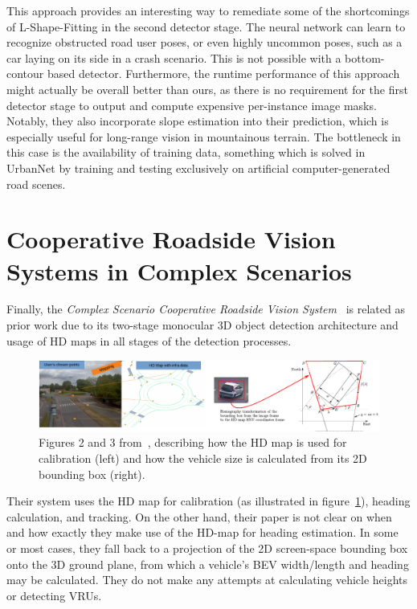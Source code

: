 This approach provides an interesting way to remediate some of the shortcomings of L-Shape-Fitting in the second detector stage.
The neural network can learn to recognize obstructed road user poses, or even highly uncommon poses, such as a car laying on its side in a crash scenario.
This is not possible with a bottom-contour based detector.
Furthermore, the runtime performance of this approach might actually be overall better than ours, as there is no requirement for the first detector stage to output and compute expensive per-instance image masks.
Notably, they also incorporate slope estimation into their prediction, which is especially useful for long-range vision in mountainous terrain.
The bottleneck in this case is the availability of training data, something which is solved in UrbanNet by training and testing exclusively on artificial computer-generated road scenes.

\section{Cooperative Roadside Vision Systems in Complex Scenarios}
\label{sec:related-crvis}

Finally, the \textit{Complex Scenario Cooperative Roadside Vision System}~\cite{masi2021augmented} is related as prior work due to its two-stage monocular 3D object detection architecture and usage of HD maps in all stages of the detection processes.

\begin{figure}[htb]
    \centering
    \includegraphics[width=1.0\linewidth]{figures/coop_roadside_vis_aug_perception_fig}
    \caption{Figures 2 and 3 from~\cite{masi2021augmented}, describing how the HD map is used for calibration (left) and how the vehicle size is calculated from its 2D bounding box (right).}
    \label{fig:related-crvis}
\end{figure}

Their system uses the HD map for calibration (as illustrated in figure~\ref{fig:related-crvis}), heading calculation, and tracking.
On the other hand, their paper is not clear on when and how exactly they make use of the HD-map for heading estimation.
In some or most cases, they fall back to a projection of the 2D screen-space bounding box onto the 3D ground plane, from which a vehicle's BEV width/length and heading may be calculated.
They do not make any attempts at calculating vehicle heights or detecting VRUs.

